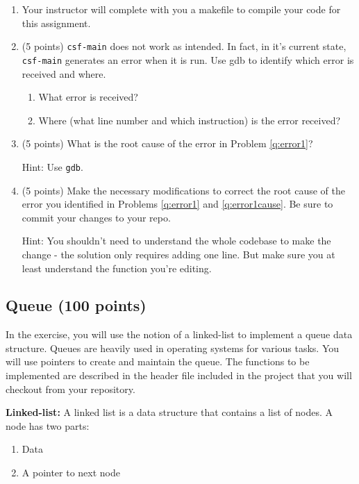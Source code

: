 \documentclass[12pt]{article}
\begin{document}
\begin{enumerate}
  \item Your instructor will complete with you a makefile to compile 
  your code for this assignment.

  \item \label{q:error1} (5 points) %
  \texttt{csf-main} does not work as intended.  In fact, in it's
  current state, \texttt{csf-main} generates an error when it is run.
  Use gdb to identify which error is received and where.
  \begin{enumerate}
    \item What error is received?
    \vfill%

    \item Where (what line number and which instruction) is the error
    received?
    \vfill%
  \end{enumerate}
  \item \label{q:error1cause} (5 points) %
  What is the root cause of the error in Problem \ref{q:error1}?

  Hint: Use \texttt{gdb}.
  \vfill%


  \item (5 points) %
  Make the necessary modifications to correct the root cause of the
  error you identified in Problems \ref{q:error1} and
  \ref{q:error1cause}.  Be sure to commit your changes to your repo.

  Hint: You shouldn't need to understand the whole codebase to make
  the change - the solution only requires adding one line.  But make
  sure you at least understand the function you're editing.\\[\baselineskip]

\end{enumerate}

\subsection{Queue (100 points)}

In the exercise, you will use the notion of a linked-list to implement
a queue data structure.  Queues are heavily used in operating systems
for various tasks.  You will use pointers to create and maintain the
queue.  The functions to be implemented are described in the header
file included in the project that you will checkout from your
repository.
 
\textbf{Linked-list:} A linked list is a data structure that contains
a list of nodes.  A node has two parts:
\begin{enumerate}
  \item Data 
  \item A pointer to next node
\end{enumerate}
\end{document}
